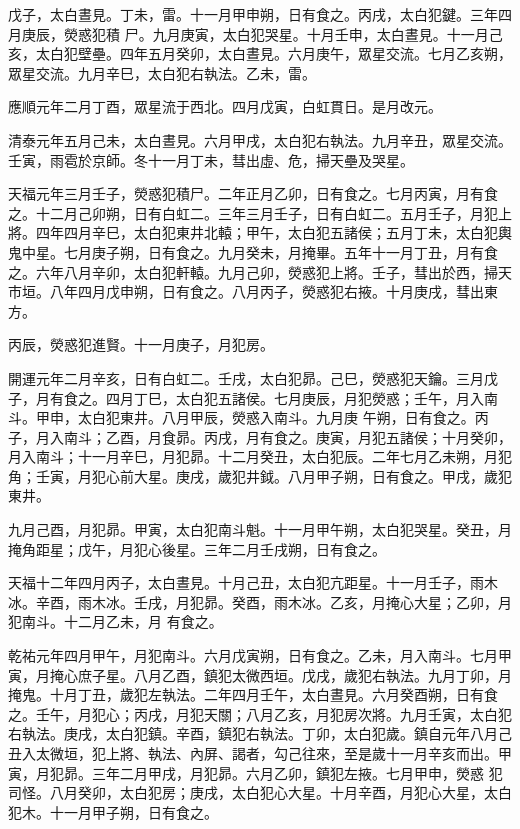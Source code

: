 \begin{pinyinscope}
 戊子，太白晝見。丁未，雷。十一月甲申朔，日有食之。丙戌，太白犯鍵。三年四月庚辰，熒惑犯積
 尸。九月庚寅，太白犯哭星。十月壬申，太白晝見。十一月己亥，太白犯壁壘。四年五月癸卯，太白晝見。六月庚午，眾星交流。七月乙亥朔，眾星交流。九月辛巳，太白犯右執法。乙未，雷。



 應順元年二月丁酉，眾星流于西北。四月戊寅，白虹貫日。是月改元。



 清泰元年五月己未，太白晝見。六月甲戌，太白犯右執法。九月辛丑，眾星交流。壬寅，雨雹於京師。冬十一月丁未，彗出虛、危，掃天壘及哭星。



 天福元年三月壬子，熒惑犯積尸。二年正月乙卯，日有食之。七月丙寅，月有食之。十二月己卯朔，日有白虹二。三年三月壬子，日有白虹二。五月壬子，月犯上
 將。四年四月辛巳，太白犯東井北轅；甲午，太白犯五諸侯；五月丁未，太白犯輿鬼中星。七月庚子朔，日有食之。九月癸未，月掩畢。五年十一月丁丑，月有食之。六年八月辛卯，太白犯軒轅。九月己卯，熒惑犯上將。壬子，彗出於西，掃天市垣。八年四月戊申朔，日有食之。八月丙子，熒惑犯右掖。十月庚戌，彗出東方。



 丙辰，熒惑犯進賢。十一月庚子，月犯房。



 開運元年二月辛亥，日有白虹二。壬戌，太白犯昴。己巳，熒惑犯天鑰。三月戊子，月有食之。四月丁巳，太白犯五諸侯。七月庚辰，月犯熒惑；壬午，月入南斗。甲申，太白犯東井。八月甲辰，熒惑入南斗。九月庚
 午朔，日有食之。丙子，月入南斗；乙酉，月食昴。丙戌，月有食之。庚寅，月犯五諸侯；十月癸卯，月入南斗；十一月辛巳，月犯昴。十二月癸丑，太白犯辰。二年七月乙未朔，月犯角；壬寅，月犯心前大星。庚戌，歲犯井鉞。八月甲子朔，日有食之。甲戌，歲犯東井。



 九月己酉，月犯昴。甲寅，太白犯南斗魁。十一月甲午朔，太白犯哭星。癸丑，月掩角距星；戊午，月犯心後星。三年二月壬戌朔，日有食之。



 天福十二年四月丙子，太白晝見。十月己丑，太白犯亢距星。十一月壬子，雨木冰。辛酉，雨木冰。壬戌，月犯昴。癸酉，雨木冰。乙亥，月掩心大星；乙卯，月犯南斗。十二月乙未，月
 有食之。



 乾祐元年四月甲午，月犯南斗。六月戊寅朔，日有食之。乙未，月入南斗。七月甲寅，月掩心庶子星。八月乙酉，鎮犯太微西垣。戊戌，歲犯右執法。九月丁卯，月掩鬼。十月丁丑，歲犯左執法。二年四月壬午，太白晝見。六月癸酉朔，日有食之。壬午，月犯心；丙戌，月犯天關；八月乙亥，月犯房次將。九月壬寅，太白犯右執法。庚戌，太白犯鎮。辛酉，鎮犯右執法。丁卯，太白犯歲。鎮自元年八月己丑入太微垣，犯上將、執法、內屏、謁者，勾己往來，至是歲十一月辛亥而出。甲寅，月犯昴。三年二月甲戌，月犯昴。六月乙卯，鎮犯左掖。七月甲申，熒惑
 犯司怪。八月癸卯，太白犯房；庚戌，太白犯心大星。十月辛酉，月犯心大星，太白犯木。十一月甲子朔，日有食之。




\end{pinyinscope}
